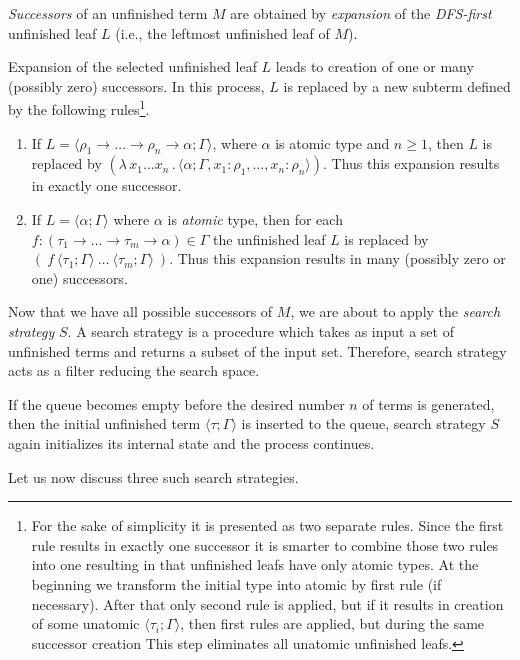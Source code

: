 \documentclass[conference]{IEEEtran}
\newcommand{\Lets}{Let us\xspace}
\newcommand{\lamb}[2]{( \lambda \, #1 \, . \, #2 )}
\newcommand{\ar}{\rightarrow\xspace}
\newcommand{\ul}[2]{\langle #1 ; #2 \rangle}
\begin{document}
\textit{Successors} of an unfinished term $M$ are obtained by 
\textit{expansion} of the \mbox{\textit{DFS-first}} unfinished leaf $L$
(i.e., the leftmost unfinished leaf of $M$).

Expansion of the selected unfinished leaf $L$ leads to creation of 
one or many (possibly zero) successors.
In this process, $L$ is replaced
by a new subterm defined by the following rules\footnote{
For the sake of simplicity it is presented as two separate rules. 
Since the first rule results in exactly one successor it is smarter
to combine those two rules into one resulting in that unfinished leafs
have only atomic types. At the beginning we transform the initial type into atomic by first rule (if necessary). After that
only second rule is applied, but if it results in creation of some unatomic 
$\ul{\tau_i}{\Gamma}$, then first rules are applied, but during the same successor creation This step eliminates all unatomic unfinished leafs. }.
\begin{enumerate}
 \item If $L = \ul{\rho_1 \ar \dots \ar \rho_n \ar \alpha}{\Gamma}$,
 	   where $\alpha$ is atomic type and $n \geq 1$, 
       then $L$ is replaced by 
       $\lamb{x_1 \dots x_n}{\ul{\alpha}
       {\Gamma,x_1 \colon \rho_1,\dots,x_n \colon \rho_n}}$.
       Thus this expansion results in exactly one successor.  
 \item If $L = \ul{\alpha}{\Gamma}$ where $\alpha$ is \textit{atomic} type,
       then for each 
       \mbox{$f : (\tau_1 \ar \dots \ar \tau_m \ar \alpha) \in \Gamma$}
       the unfinished leaf $L$ is replaced by 
       $(~f~\ul{\tau_1}{\Gamma}~\dots~\ul{\tau_m}{\Gamma}~)$.
       Thus this expansion results in many (possibly zero or one) successors.
\end{enumerate}

Now that we have all possible successors of $M$, we are about to apply
the \textit{search strategy} $S$. A search strategy is a procedure
which takes as input a set of unfinished terms and returns a subset
of the input set. Therefore, search strategy acts as a filter reducing 
the search space. 

If the queue becomes empty before the desired number $n$ of terms
is generated, then the initial unfinished term $\ul{\tau}{\Gamma}$ 
is inserted to the queue, search strategy $S$
again initializes its internal state and the process continues.

\Lets now discuss three such search strategies.
\end{document}
